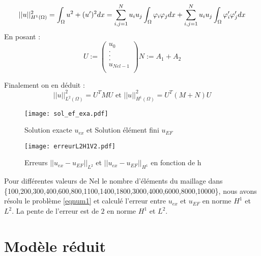 \documentclass[12pt]{article}
\begin{document}
$$
|| u||_{H^{1}(\Omega)}^{2} = \int_{\Omega} u^2 + (u')^2 dx \\
= \sum_{i, j = 1}^{N} u_i u_j\int_{\Omega} \varphi_i\varphi_j dx + 
\sum_{i, j = 1}^{N} u_i u_j\int_{\Omega} \varphi_i'\varphi_j'dx \\
$$
\noindent En posant : 
$$ 
U :=\begin{pmatrix}
u_{0}\\

. \\

. \\

. \\
u_{Nel-1}\\
\end{pmatrix}
N := A_1 + A_2
$$

\noindent Finalement on en déduit :
$$
||u||_{L^{2}(\Omega)}^{2} = U^{T}MU \text{       et        } ||u||_{H^{1}(\Omega)}^{2} = U^{T}(M+N)U 
$$


\begin{figure}[H]
\begin{center}
\texttt{[image: sol\_ef\_exa.pdf]}
\caption[]{Solution exacte  $u_{ex}$ et Solution élément fini $u_{EF}$  }
\end{center}
\end{figure}


\begin{figure}[H]
\begin{center}
\texttt{[image: erreurL2H1V2.pdf]}
\caption[]{Erreurs $|| u_{ex} - u_{EF}||_{L^{2}}$ et $|| u_{ex} - u_{EF}||_{H^{1}}$ en fonction de h}
\end{center}
\end{figure}


Pour différentes valeurs de Nel le nombre d'éléments du maillage dans \\
\{100,200,300,400,600,800,1100,1400,1800,3000,4000,6000,8000,10000\}, nous avons résolu le problème \eqref{eqnum1} et calculé l'erreur entre $u_{ex}$ et $u_{EF}$ en norme $H^1$ et $L^{2}$. La pente de l'erreur est de $2$ en norme $H^1$ et $L^{2}$.


\begin{comment}
    , ce qui est conforme aux attentes théoriques
\end{comment}






\section{Modèle réduit}
\label{br}
\end{document}
